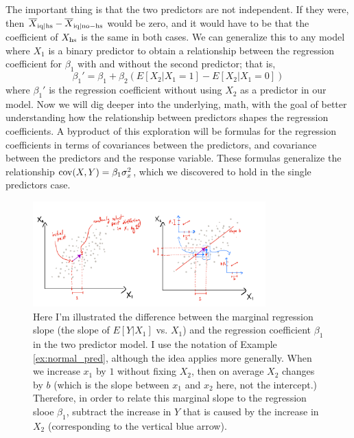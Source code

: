 The important thing is that the two predictors are not independent. If they were, then $\overline{X}_{{\rm iq}|{\rm hs}}-\overline{X}_{{\rm iq}|{\rm no-hs}}$ would be zero, and it would have to be that the coefficient of $X_{\rm hs}$ is the same in both cases. We can generalize this to any model where $X_1$ is a binary predictor to obtain a relationship between the regression coefficient for $\beta_1$ with and without the second predictor; that is, 
\begin{equation*}
\beta_1' = \beta_1 + \beta_2(E[X_2|X_1=1]-E[X_2|X_1=0])
\end{equation*}
where $\beta_1'$ is the regression coefficient without using $X_2$ as a predictor in our model. 
 Now we will dig deeper into the underlying, math, with the goal of better understanding how the relationship between predictors shapes the regression coefficients. A byproduct of this exploration will be formulas for the regression coefficients in terms of covariances between the predictors, and covariance between the predictors and the response variable. These formulas generalize the relationship ${\rm cov}(X,Y) = \beta_1\sigma_x^2$, which we discovered to hold in the single predictors case. 


\begin{figure}[h]
    \centering
    \includegraphics[width=0.8\textwidth]{./../figures/correlated_predictors}
    \caption{Here I'm illustrated the difference between the marginal regression slope (the slope of $E[Y|X_1]$ vs. $X_1$) and the regression coefficient $\beta_1$ in the two predictor model.  I use the notation of Example \ref{ex:normal_pred}, although the idea applies more generally. When we increase $x_1$ by $1$ without fixing $X_2$, then on average $X_2$ changes by $b$ (which is the slope between $x_1$ and $x_2$ here, not the intercept.) Therefore, in order to relate this marginal slope to the regression slooe $\beta_1$, subtract the increase in $Y$ that is caused by the increase in $X_2$ (corresponding to the vertical blue arrow).   }
    \label{fig:plane}
\end{figure}

